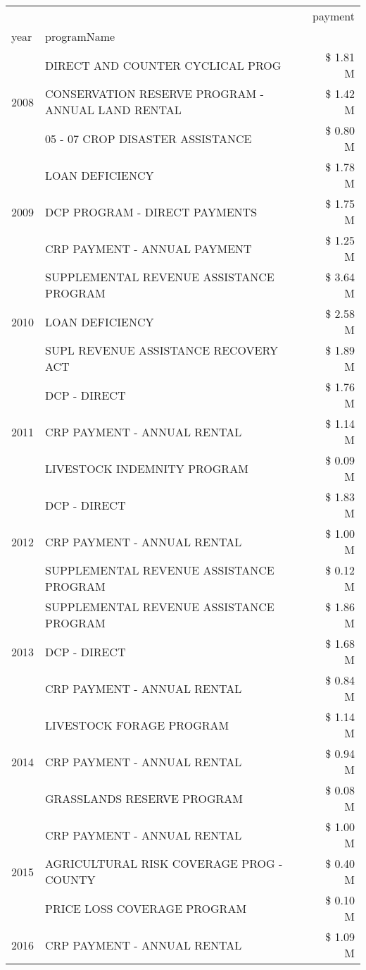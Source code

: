 \begin{tabular}{llr}
\toprule
 &  & payment \\
year & programName &  \\
\midrule
\multirow[t]{3}{*}{2008} & DIRECT AND COUNTER CYCLICAL PROG & \$ 1.81 M \\
 & CONSERVATION RESERVE PROGRAM - ANNUAL LAND RENTAL & \$ 1.42 M \\
 & 05 - 07 CROP DISASTER ASSISTANCE & \$ 0.80 M \\
\cline{1-3}
\multirow[t]{3}{*}{2009} & LOAN DEFICIENCY & \$ 1.78 M \\
 & DCP PROGRAM - DIRECT PAYMENTS & \$ 1.75 M \\
 & CRP PAYMENT - ANNUAL PAYMENT & \$ 1.25 M \\
\cline{1-3}
\multirow[t]{3}{*}{2010} & SUPPLEMENTAL REVENUE ASSISTANCE PROGRAM & \$ 3.64 M \\
 & LOAN DEFICIENCY & \$ 2.58 M \\
 & SUPL REVENUE ASSISTANCE RECOVERY ACT & \$ 1.89 M \\
\cline{1-3}
\multirow[t]{3}{*}{2011} & DCP - DIRECT & \$ 1.76 M \\
 & CRP PAYMENT - ANNUAL RENTAL & \$ 1.14 M \\
 & LIVESTOCK INDEMNITY PROGRAM & \$ 0.09 M \\
\cline{1-3}
\multirow[t]{3}{*}{2012} & DCP - DIRECT & \$ 1.83 M \\
 & CRP PAYMENT - ANNUAL RENTAL & \$ 1.00 M \\
 & SUPPLEMENTAL REVENUE ASSISTANCE PROGRAM & \$ 0.12 M \\
\cline{1-3}
\multirow[t]{3}{*}{2013} & SUPPLEMENTAL REVENUE ASSISTANCE PROGRAM & \$ 1.86 M \\
 & DCP - DIRECT & \$ 1.68 M \\
 & CRP PAYMENT - ANNUAL RENTAL & \$ 0.84 M \\
\cline{1-3}
\multirow[t]{3}{*}{2014} & LIVESTOCK FORAGE PROGRAM & \$ 1.14 M \\
 & CRP PAYMENT - ANNUAL RENTAL & \$ 0.94 M \\
 & GRASSLANDS RESERVE PROGRAM & \$ 0.08 M \\
\cline{1-3}
\multirow[t]{3}{*}{2015} & CRP PAYMENT - ANNUAL RENTAL & \$ 1.00 M \\
 & AGRICULTURAL RISK COVERAGE PROG - COUNTY & \$ 0.40 M \\
 & PRICE LOSS COVERAGE PROGRAM & \$ 0.10 M \\
\cline{1-3}
\multirow[t]{3}{*}{2016} & CRP PAYMENT - ANNUAL RENTAL & \$ 1.09 M \\

\end{tabular}
